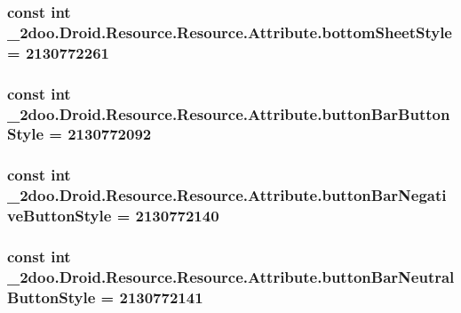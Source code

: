 \hypertarget{class__2doo_1_1_droid_1_1_resource_1_1_attribute_50a91f5c4d8f09ad85c8767d44faf03d}{
\subsubsection[{bottomSheetStyle}]{\setlength{\rightskip}{0pt plus 5cm}const int \_\-2doo.Droid.Resource.Resource.Attribute.bottomSheetStyle = 2130772261}}
\label{class__2doo_1_1_droid_1_1_resource_1_1_attribute_50a91f5c4d8f09ad85c8767d44faf03d}


\hypertarget{class__2doo_1_1_droid_1_1_resource_1_1_attribute_3cea047740efaf7647840f09b44f28de}{
\subsubsection[{buttonBarButtonStyle}]{\setlength{\rightskip}{0pt plus 5cm}const int \_\-2doo.Droid.Resource.Resource.Attribute.buttonBarButtonStyle = 2130772092}}
\label{class__2doo_1_1_droid_1_1_resource_1_1_attribute_3cea047740efaf7647840f09b44f28de}


\hypertarget{class__2doo_1_1_droid_1_1_resource_1_1_attribute_36436c2c0438c8d02e5b18f18ecf9271}{
\subsubsection[{buttonBarNegativeButtonStyle}]{\setlength{\rightskip}{0pt plus 5cm}const int \_\-2doo.Droid.Resource.Resource.Attribute.buttonBarNegativeButtonStyle = 2130772140}}
\label{class__2doo_1_1_droid_1_1_resource_1_1_attribute_36436c2c0438c8d02e5b18f18ecf9271}


\hypertarget{class__2doo_1_1_droid_1_1_resource_1_1_attribute_a4abffa134635c77fa3b4e79952acb44}{
\subsubsection[{buttonBarNeutralButtonStyle}]{\setlength{\rightskip}{0pt plus 5cm}const int \_\-2doo.Droid.Resource.Resource.Attribute.buttonBarNeutralButtonStyle = 2130772141}}
\label{class__2doo_1_1_droid_1_1_resource_1_1_attribute_a4abffa134635c77fa3b4e79952acb44}


